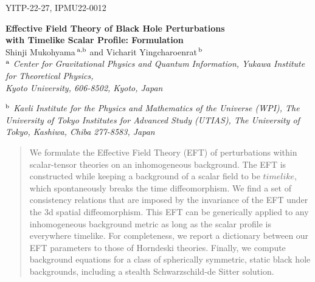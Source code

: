 \documentclass[a4paper,11pt]{article}
\date{\today}
\numberwithin{equation}{section}
\begin{document}
\begin{flushright} {\footnotesize YITP-22-27, IPMU22-0012}  \end{flushright}

\begin{center}
\LARGE{\bf Effective Field Theory of Black Hole Perturbations\\
 with Timelike Scalar Profile: Formulation}
\\[1cm] 

\large{Shinji Mukohyama$^{\,\rm a, \rm b}$ and Vicharit Yingcharoenrat$^{\,\rm b}$}
\\[0.5cm]

\small{
\textit{$^{\rm a}$
Center for Gravitational Physics and Quantum Information, Yukawa Institute for Theoretical Physics, 
\\ Kyoto University, 606-8502, Kyoto, Japan}}
\vspace{.2cm}

\small{
\textit{$^{\rm b}$
Kavli Institute for the Physics and Mathematics of the Universe (WPI), The University of Tokyo Institutes for Advanced Study (UTIAS), The University of Tokyo, Kashiwa, Chiba 277-8583, Japan}}
\vspace{.2cm}
\end{center}

\vspace{0.3cm} 

\begin{abstract}\normalsize
We formulate the Effective Field Theory (EFT) of perturbations within scalar-tensor theories on an inhomogeneous background. The EFT is constructed while keeping a background of a scalar field to be $\textit{timelike}$, which spontaneously breaks the time diffeomorphism. We find a set of consistency relations that are imposed by the invariance of the EFT under the 3d spatial diffeomorphism. This EFT can be generically applied to any inhomogeneous background metric as long as the scalar profile is everywhere timelike. For completeness, we report a dictionary between our EFT parameters to those of Horndeski theories. Finally, we compute background equations for a class of spherically symmetric, static black hole backgrounds, including a stealth Schwarzschild-de Sitter solution. 
\end{abstract}

\vspace{0.3cm} 

\vspace{2cm}

\newpage
{
\hypersetup{linkcolor=black}
\tableofcontents
}
\end{document}
